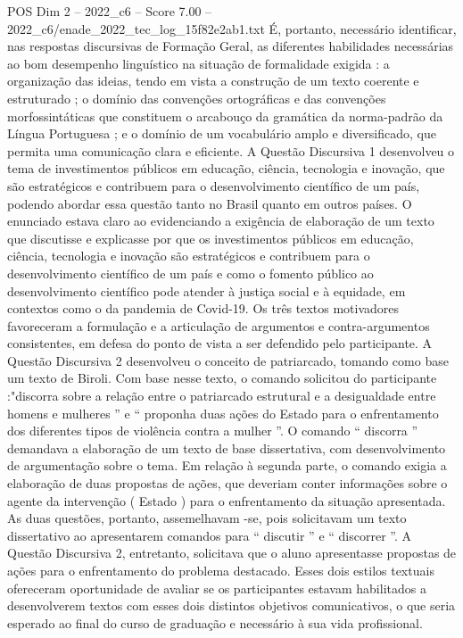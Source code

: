 \begin{textsample}{POS Dim 2 – 2022\_c6 – Score 7.00 – 2022\_c6/enade\_2022\_tec\_log\_15f82e2ab1.txt}
É, portanto, necessário identificar, nas respostas discursivas de Formação Geral, as diferentes habilidades necessárias ao bom desempenho linguístico na situação de formalidade exigida : a organização das ideias, tendo em vista a construção de um texto coerente e estruturado ; o domínio das convenções ortográficas e das convenções morfossintáticas que constituem o arcabouço da gramática da norma-padrão da Língua Portuguesa ; e o domínio de um vocabulário amplo e diversificado, que permita uma comunicação clara e eficiente.
A Questão Discursiva 1 desenvolveu o tema de investimentos públicos em educação, ciência, tecnologia e inovação, que são estratégicos e contribuem para o desenvolvimento científico de um país, podendo abordar essa questão tanto no Brasil quanto em outros países.
O enunciado estava claro ao evidenciando a exigência de elaboração de um texto que discutisse e explicasse por que os investimentos públicos em educação, ciência, tecnologia e inovação são estratégicos e contribuem para o desenvolvimento científico de um país e como o fomento público ao desenvolvimento científico pode atender à justiça social e à equidade, em contextos como o da pandemia de Covid-19.
Os três textos motivadores favoreceram a formulação e a articulação de argumentos e contra-argumentos consistentes, em defesa do ponto de vista a ser defendido pelo participante.
A Questão Discursiva 2 desenvolveu o conceito de patriarcado, tomando como base um texto de Biroli.
Com base nesse texto, o comando solicitou do participante :"discorra sobre a relação entre o patriarcado estrutural e a desigualdade entre homens e mulheres ” e “ proponha duas ações do Estado para o enfrentamento dos diferentes tipos de violência contra a mulher ”.
O comando “ discorra ” demandava a elaboração de um texto de base dissertativa, com desenvolvimento de argumentação sobre o tema.
Em relação à segunda parte, o comando exigia a elaboração de duas propostas de ações, que deveriam conter informações sobre o agente da intervenção ( Estado ) para o enfrentamento da situação apresentada.
As duas questões, portanto, assemelhavam -se, pois solicitavam um texto dissertativo ao apresentarem comandos para “ discutir ” e “ discorrer ”.
A Questão Discursiva 2, entretanto, solicitava que o aluno apresentasse propostas de ações para o enfrentamento do problema destacado.
Esses dois estilos textuais ofereceram oportunidade de avaliar se os participantes estavam habilitados a desenvolverem textos com esses dois distintos objetivos comunicativos, o que seria esperado ao final do curso de graduação e necessário à sua vida profissional.

\end{textsample}
